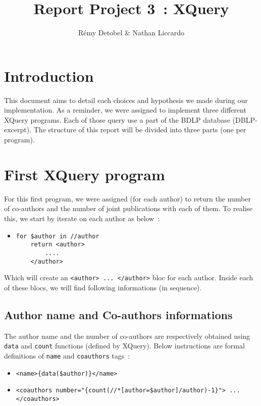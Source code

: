 \documentclass{article}
\author{R\'emy Detobel \& Nathan Liccardo}
\title{Report Project 3~: XQuery}
\begin{document}
\maketitle

\section{Introduction}
  This document aims to detail each choices and hypothesis we made during our implementation. As a reminder, we were assigned to implement three different XQuery programs. Each of those query use a part of the BDLP database (DBLP-excerpt). The structure of this report will be divided into three parts (one per program).

\section{First XQuery program}
  For this first program, we were assigned (for each author) to return the number of co-authors and the number of joint publications with each of them. To realise this, we start by iterate on each author as below~: 
  \begin{itemize}
    \item \begin{verbatim}
for $author in //author
    return <author>
        ....
    </author>\end{verbatim}
  \end{itemize}
  Which will create an \verb|<author> ... </author>| bloc for each author. Inside each of these blocs, we will find following informations (in sequence).
  
  \subsection{Author name and Co-authors informations}
    The author name and the number of co-authors are respectively obtained using \verb|data| and \verb|count| functions (defined by XQuery). Below instructions are formal definitions of \verb|name| and \verb|coauthors| tags~:
    \begin{itemize}
      \item \verb|<name>{data($author)}</name>|
      \item \verb|<coauthors number="{count(//*[author=$author]/author)-1}"> ... </coauthors>|
    \end{itemize}
    
\end{document}
